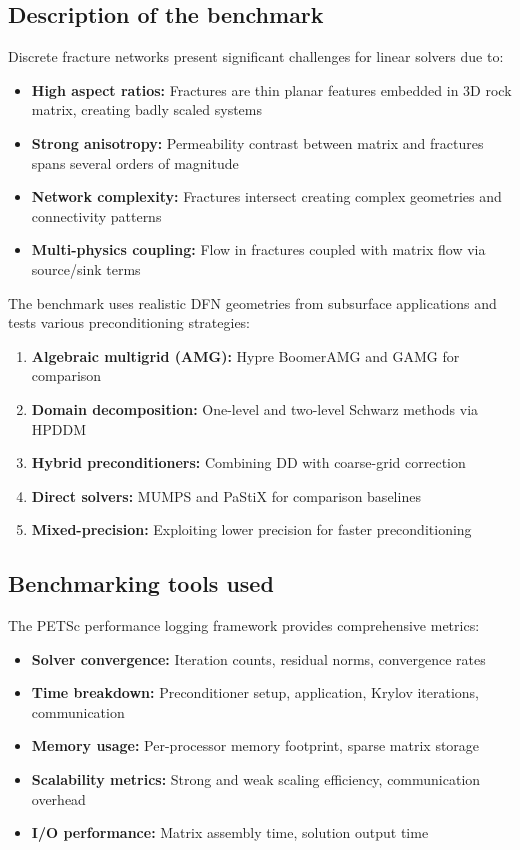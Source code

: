 \subsection{Description of the benchmark}

Discrete fracture networks present significant challenges for linear solvers due to:

\begin{itemize}
\item \textbf{High aspect ratios:} Fractures are thin planar features embedded in 3D rock matrix, creating badly scaled systems
\item \textbf{Strong anisotropy:} Permeability contrast between matrix and fractures spans several orders of magnitude
\item \textbf{Network complexity:} Fractures intersect creating complex geometries and connectivity patterns
\item \textbf{Multi-physics coupling:} Flow in fractures coupled with matrix flow via source/sink terms
\end{itemize}

The benchmark uses realistic DFN geometries from subsurface applications and tests various preconditioning strategies:

\begin{enumerate}
\item \textbf{Algebraic multigrid (AMG):} Hypre BoomerAMG and GAMG for comparison
\item \textbf{Domain decomposition:} One-level and two-level Schwarz methods via HPDDM
\item \textbf{Hybrid preconditioners:} Combining DD with coarse-grid correction
\item \textbf{Direct solvers:} MUMPS and PaStiX for comparison baselines
\item \textbf{Mixed-precision:} Exploiting lower precision for faster preconditioning
\end{enumerate}



\subsection{Benchmarking tools used}

The PETSc performance logging framework provides comprehensive metrics:

\begin{itemize}
\item \textbf{Solver convergence:} Iteration counts, residual norms, convergence rates
\item \textbf{Time breakdown:} Preconditioner setup, application, Krylov iterations, communication
\item \textbf{Memory usage:} Per-processor memory footprint, sparse matrix storage
\item \textbf{Scalability metrics:} Strong and weak scaling efficiency, communication overhead
\item \textbf{I/O performance:} Matrix assembly time, solution output time
\end{itemize}

